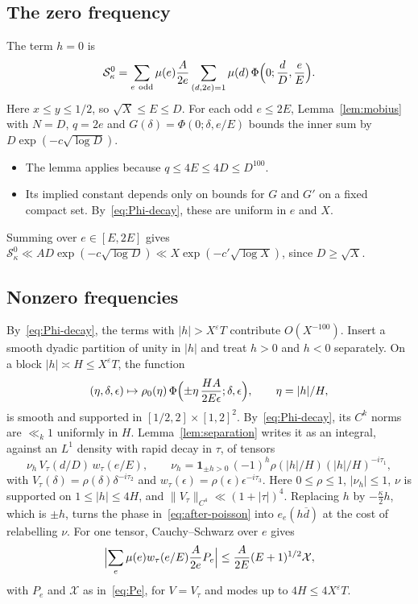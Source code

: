 \documentclass[11pt]{amsart}
\theoremstyle{definition}
\theoremstyle{remark}
\numberwithin{equation}{section}
\newcommand{\cS}{\mathcal S}
\newcommand{\cX}{\mathcal X}
\newcommand{\eps}{\varepsilon}
\newcommand{\inv}[1]{\overline{#1}}
\begin{document}
\subsection{The zero frequency}
The term $h=0$ is
\begin{equation}\label{eq:zero-mode}
 \cS_\kappa^0=\sum_{e\ \mathrm{odd}}\mu(e)\frac A{2e}
 \sum_{(d,2e)=1}\mu(d)\,\Phi\Bigl(0;\frac dD,\frac eE\Bigr).
\end{equation}
Here $x\le y\le1/2$, so $\sqrt X\le E\le D$.  For each odd $e\le2E$,
Lemma~\ref{lem:mobius} with $N=D$, $q=2e$ and
$G(\delta)=\Phi(0;\delta,e/E)$ bounds the inner sum by
$D\exp(-c\sqrt{\log D})$.
\begin{itemize}
\item The lemma applies because $q\le4E\le4D\le D^{100}$.
\item Its implied constant depends only on bounds for $G$ and $G'$ on a
fixed compact set.  By~\eqref{eq:Phi-decay}, these are uniform in $e$ and
$X$.
\end{itemize}
Summing over $e\in[E,2E]$ gives
$\cS_\kappa^0\ll AD\exp(-c\sqrt{\log D})\ll X\exp(-c'\sqrt{\log X})$,
since $D\ge\sqrt X$.

\subsection{Nonzero frequencies}
By~\eqref{eq:Phi-decay}, the terms with $|h|>X^{\eps}T$ contribute
$O(X^{-100})$.  Insert a smooth dyadic partition of unity in $|h|$ and treat
$h>0$ and $h<0$ separately.  On a block $|h|\asymp H\le X^{\eps}T$, the
function
\[
 (\eta,\delta,\epsilon)\mapsto\rho_0(\eta)\,
 \Phi\Bigl(\pm\eta\,\frac{HA}{2E\epsilon};\delta,\epsilon\Bigr),
 \qquad \eta=|h|/H,
\]
is smooth and supported in $[1/2,2]\times[1,2]^2$.  By~\eqref{eq:Phi-decay},
its $C^k$ norms are $\ll_{k}1$ uniformly in $H$.  Lemma~\ref{lem:separation}
writes it as an integral, against an $L^1$ density with rapid decay in
$\tau$, of tensors
\[
 \nu_h\,V_\tau(d/D)\,w_\tau(e/E),\qquad
 \nu_h=\mathbf 1_{\pm h>0}\,(-1)^h\rho(|h|/H)(|h|/H)^{-i\tau_1},
\]
with $V_\tau(\delta)=\rho(\delta)\delta^{-i\tau_2}$ and
$w_\tau(\epsilon)=\rho(\epsilon)\epsilon^{-i\tau_3}$.  Here $0\le\rho\le1$,
$|\nu_h|\le1$, $\nu$ is supported on $1\le|h|\le 4H$, and
$\|V_\tau\|_{C^4}\ll(1+|\tau|)^4$.  Replacing $h$ by $-\tfrac\kappa2h$,
which is $\pm h$, turns the phase in~\eqref{eq:after-poisson} into
$e_e(h\inv d)$ at the cost of relabelling $\nu$.  For one tensor, Cauchy--Schwarz over $e$ gives
\[
 \Bigl|\sum_{e}\mu(e)w_\tau(e/E)\frac A{2e}P_e\Bigr|
 \le\frac A{2E}(E+1)^{1/2}\cX,
\]
with $P_e$ and $\cX$ as in~\eqref{eq:Pe}, for $V=V_\tau$ and modes up to
$4H\le4X^{\eps}T$.
\end{document}
